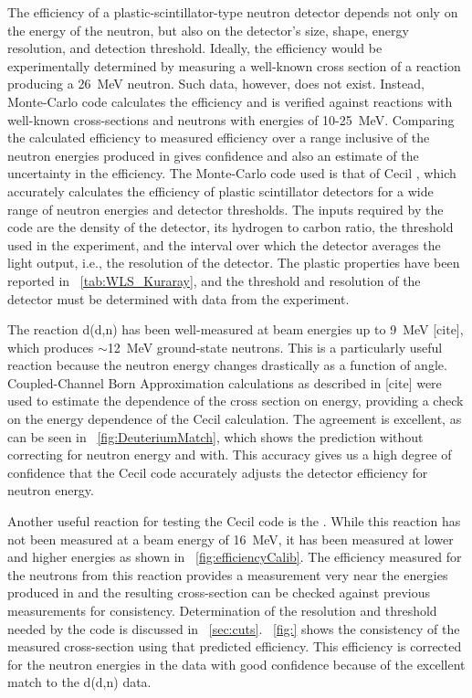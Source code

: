 The efficiency of a plastic-scintillator-type neutron detector depends not only on the energy of the neutron, but also on the detector's size, shape, energy resolution, and detection threshold.  Ideally, the efficiency would be experimentally determined by measuring a well-known cross section of a reaction producing a 26~MeV neutron.  Such data, however, does not exist.  Instead, Monte-Carlo code calculates the efficiency and is verified against reactions with well-known cross-sections and neutrons with energies of 10-25~MeV.  Comparing the calculated efficiency to measured efficiency over a range inclusive of the neutron energies produced in \reaction gives confidence and also an estimate of the uncertainty in the efficiency.  The Monte-Carlo code used is that of Cecil \cite{Cecil_neutEfficiency}, which accurately calculates the efficiency of plastic scintillator detectors for a wide range of neutron energies and detector thresholds.  The inputs required by the code are the density of the detector, its hydrogen to carbon ratio, the threshold used in the experiment, and the interval over which the detector averages the light output, i.e., the resolution of the detector.  The plastic properties have been reported in {\tab}~\ref{tab:WLS_Kuraray}, and the threshold and resolution of the detector must be determined with data from the experiment.  

The reaction d(d,n) has been well-measured at beam energies up to 9~MeV [cite], which produces $\sim$12~MeV ground-state neutrons.  This is a particularly useful reaction because the neutron energy changes drastically as a function of angle.  Coupled-Channel Born Approximation calculations as described in [cite] were used to estimate the dependence of the cross section on energy, providing a check on the energy dependence of the Cecil calculation.  The agreement is excellent, as can be seen in {\fig}~\ref{fig:DeuteriumMatch}, which shows the prediction without correcting for neutron energy and with.  This accuracy gives us a high degree of confidence that the Cecil code accurately adjusts the detector efficiency for neutron energy.  

Another useful reaction for testing the Cecil code is the \MgReaction.  While this reaction has not been measured at a beam energy of 16~MeV, it has been measured at lower and higher energies as shown in {\fig}~\ref{fig:efficiencyCalib}.  The efficiency measured for the neutrons from this reaction provides a measurement very near the energies produced in \reaction and the resulting cross-section can be checked against previous measurements for consistency.  Determination of the resolution and threshold needed by the code is discussed in {\sect}~\ref{sec:cuts}.  {\fig}~\ref{fig:} shows the consistency of the measured cross-section using that predicted efficiency.  This efficiency is corrected for the neutron energies in the \reaction data with good confidence because of the excellent match to the d(d,n) data.


